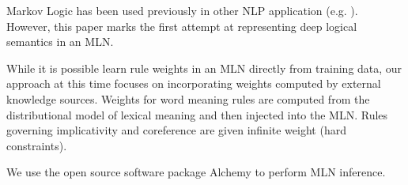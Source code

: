 Markov Logic has been used previously in other NLP application
(e.g. \citet{poon:emnlp2009}).  However, this paper marks the first attempt at
representing deep logical semantics in an MLN.

While it is possible learn rule weights in an MLN directly from training data,
our approach at this time focuses on incorporating weights computed
by external knowledge sources.  Weights for word meaning rules are computed from
the distributional model of lexical meaning and then injected into the MLN. 
Rules governing implicativity and coreference are given infinite weight
(hard constraints).

We use the open source software package Alchemy \citep{kok:tr05} to perform MLN
inference.
